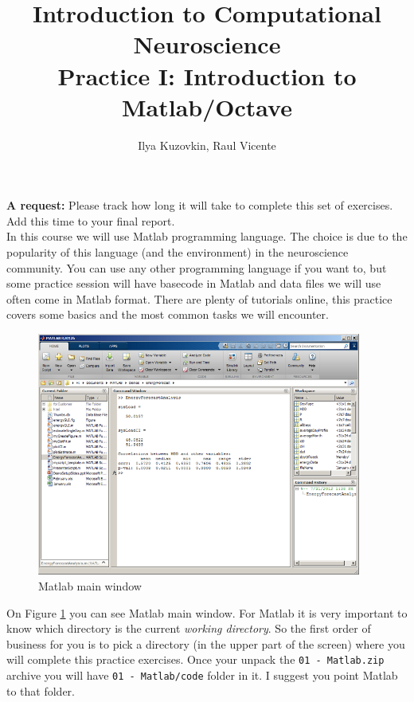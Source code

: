 \documentclass[a4paper,11pt]{article}
\author{\large{Ilya Kuzovkin, Raul Vicente}}
\title{\huge{Introduction to Computational Neuroscience}\\\LARGE{Practice I: Introduction to Matlab/Octave}}
\begin{document}
\maketitle

\textbf{A request:} Please track how long it will take to complete this set of exercises. Add this time to your final report.
\ \\

In this course we will use Matlab programming language. The choice is due to the popularity of this language (and the environment) in the neuroscience community. You can use any other programming language if you want to, but some practice session will have basecode in Matlab and data files we will use often come in Matlab format. There are plenty of tutorials online, this practice covers some basics and the most common tasks we will encounter.
\ \\


%
%
\begin{figure}[H]
   \centering
   \includegraphics[width=0.95\textwidth]{matlab.png} 
   \caption{Matlab main window}
   \label{fig:matlabgui}
\end{figure}
On Figure \ref{fig:matlabgui} you can see Matlab main window. For Matlab it is very important to know which directory is the current \emph{working directory}. So the first order of business for you is to pick a directory (in the upper part of the screen) where you will complete this practice exercises. Once your unpack the \texttt{01 - Matlab.zip} archive you will have \texttt{01 - Matlab/code} folder in it. I suggest you point Matlab to that folder.\\
\end{document}
